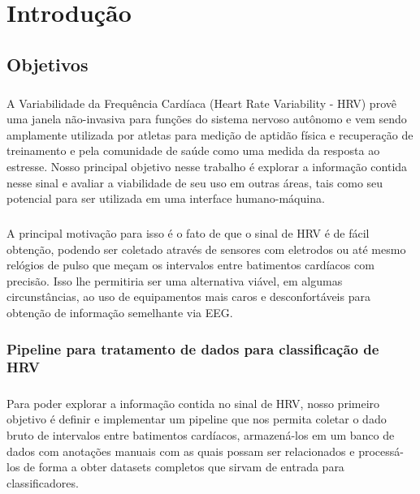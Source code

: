 \chapter{Introdução} 
\label{intro}


    \section{Objetivos}
    \label{goals}
    
        \paragraph{} A Variabilidade da Frequência Cardíaca (Heart Rate Variability - HRV) provê uma janela não-invasiva para funções do sistema nervoso autônomo e vem sendo amplamente utilizada por atletas para medição de aptidão física e recuperação de treinamento e pela comunidade de saúde como uma medida da resposta ao estresse. Nosso principal objetivo nesse trabalho é explorar a informação contida nesse sinal e avaliar a viabilidade de seu uso em outras áreas, tais como seu potencial para ser utilizada em uma interface humano-máquina. 
        
        \paragraph{} A principal motivação para isso é o fato de que o sinal de HRV é de fácil obtenção, podendo ser coletado através de sensores com eletrodos ou até mesmo relógios de pulso que meçam os intervalos entre batimentos cardíacos com precisão. Isso lhe permitiria ser uma alternativa viável, em algumas circunstâncias, ao uso de equipamentos mais caros e desconfortáveis para obtenção de informação semelhante via EEG.
        
        \subsection{Pipeline para tratamento de dados para classificação de HRV}
        
            \paragraph{} Para poder explorar a informação contida no sinal de HRV, nosso primeiro objetivo é definir e implementar um pipeline que nos permita coletar o dado bruto de intervalos entre batimentos cardíacos, armazená-los em um banco de dados com anotações manuais com as quais possam ser relacionados e processá-los de forma a obter datasets completos que sirvam de entrada para classificadores. 
